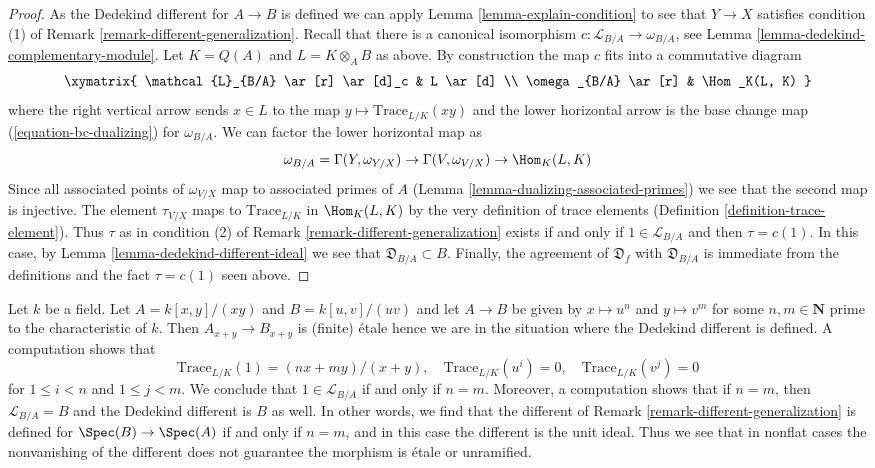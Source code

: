 \begin{proof}
As the Dedekind different for $A \to B$ is defined we can apply
Lemma \ref{lemma-explain-condition} to see that
$Y \to X$ satisfies condition (1) of
Remark \ref{remark-different-generalization}.
Recall that there is a canonical isomorphism
$c : \mathcal{L}_{B/A} \to \omega_{B/A}$, see
Lemma \ref{lemma-dedekind-complementary-module}.
Let $K = Q(A)$ and $L = K \otimes_A B$ as above.
By construction the map $c$ fits into a commutative diagram
$$
\xymatrix{
\mathcal{L}_{B/A} \ar[r] \ar[d]_c & L \ar[d] \\
\omega_{B/A} \ar[r] & \Hom_K(L, K)
}
$$
where the right vertical arrow sends $x \in L$ to the map
$y \mapsto \text{Trace}_{L/K}(xy)$ and the lower horizontal
arrow is the base change map (\ref{equation-bc-dualizing}) for $\omega_{B/A}$.
We can factor the lower horizontal map as
$$
\omega_{B/A} = \Gamma(Y, \omega_{Y/X})
\to \Gamma(V, \omega_{V/X}) \to \Hom_K(L, K)
$$
Since all associated points of $\omega_{V/X}$
map to associated primes of $A$
(Lemma \ref{lemma-dualizing-associated-primes})
we see that the second map is injective.
The element $\tau_{V/X}$ maps to $\text{Trace}_{L/K}$ in
$\Hom_K(L, K)$ by the very definition of trace elements
(Definition \ref{definition-trace-element}).
Thus $\tau$ as in condition (2) of
Remark \ref{remark-different-generalization}
exists if and only if $1 \in \mathcal{L}_{B/A}$ and then
$\tau = c(1)$. In this case, by Lemma \ref{lemma-dedekind-different-ideal}
we see that $\mathfrak{D}_{B/A} \subset B$.
Finally, the agreement of $\mathfrak{D}_f$ with $\mathfrak{D}_{B/A}$
is immediate from the definitions and the fact $\tau = c(1)$ seen above.
\end{proof}

\begin{example}
\label{example-no-different}
Let $k$ be a field. Let $A = k[x, y]/(xy)$ and $B = k[u, v]/(uv)$ and let
$A \to B$ be given by $x \mapsto u^n$ and $y \mapsto v^m$ for some
$n, m \in \mathbf{N}$ prime to the characteristic of $k$. Then
$A_{x + y} \to B_{x + y}$ is (finite) \'etale hence we are in the situation
where the Dedekind different is defined. A computation shows that
$$
\text{Trace}_{L/K}(1) = (nx + my)/(x + y),\quad
\text{Trace}_{L/K}(u^i) = 0,\quad \text{Trace}_{L/K}(v^j) = 0
$$
for $1 \leq i < n$ and $1 \leq j < m$. We conclude that
$1 \in \mathcal{L}_{B/A}$ if and only if $n = m$. Moreover, a
computation shows that if $n = m$, then $\mathcal{L}_{B/A} = B$
and the Dedekind different is $B$ as well. In other words, we find that
the different of Remark \ref{remark-different-generalization}
is defined for $\Spec(B) \to \Spec(A)$
if and only if $n = m$, and in this case the different is the
unit ideal. Thus we see that in nonflat cases the nonvanishing
of the different does not guarantee the morphism is \'etale or unramified.
\end{example}







